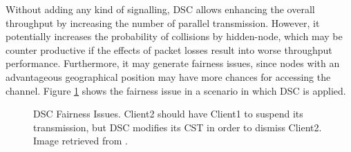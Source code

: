 \documentclass[12pt, a4paper,twoside]{tesi_upf}
\begin{document}
				 Without adding any kind of signalling, DSC allows enhancing the overall throughput by increasing the number of parallel transmission. However, it potentially increases the probability of collisions by hidden-node, which may be counter productive if the effects of packet losses result into worse throughput performance. Furthermore, it may generate fairness issues, since nodes with an advantageous geographical position may have more chances for accessing the channel. Figure \ref{fig:dsc_problems} shows the fairness issue in a scenario in which DSC is applied.
				\begin{figure}[h!]
					\centering
					\caption{DSC Fairness Issues. Client2 should have Client1 to suspend its transmission, but DSC modifies its CST in order to dismiss Client2. Image retrieved from \cite{zhong2016promise}.}
					\label{fig:dsc_problems}
				\end{figure}
					
\end{document}
